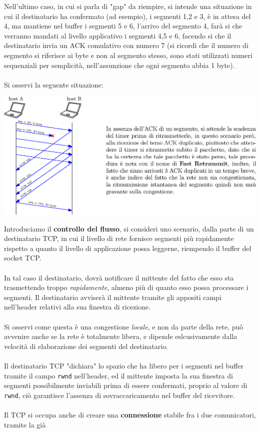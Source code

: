 \documentclass[12pt, letterpaper]{article}
\newcommand{\code}[1]{\colorbox{light-gray}{\texttt{#1}}}
\newcommand{\acc}{\\\hphantom{}\\}
\begin{document}
Nell'ultimo caso, in cui si parla di "gap" da riempire, si intende una situazione in cui il destinatario ha confermato 
(ad esempio), i segmenti 1,2 e 3, è in attesa del 4, ma mantiene nel buffer i segmenti 5 e 6, l'arrivo del 
segmento 4, farà si che verranno mandati al livello applicativo i segmenti 4,5 e 6, facendo si che il destinatario 
invia un ACK comulativo con numero 7 (si ricordi che il numero di segmento si riferisce ai byte e non al segmento 
stesso, sono stati utilizzati numeri sequenziali per semplicità, nell'assunzione che ogni segmento abbia 1 byte).\acc 
Si osservi la seguente situazione:\begin{center}
    \includegraphics[width=\textwidth ]{images/fastRetrasmit.eps}
\end{center} 
Introduciamo il \textbf{controllo del flusso}, si consideri uno scenario, dalla parte di un destinatario 
TCP, in cui il livello di rete fornisce segmenti più rapidamente rispetto a quanto il livello di applicazione 
possa leggerne, riempendo il buffer del socket TCP. \acc In tal caso il destinatario, dovrà notificare il mittente del 
fatto che esso sta trasmettendo troppo \textit{rapidamente}, almeno più di quanto esso possa processare i 
segmenti. Il destinatario avviserà il mittente tramite gli appositi campi nell'header relativi alla sua finestra 
di ricezione.\acc 
Si osservi come questa è una congestione \textit{locale}, e non da parte della rete, può avvenire anche se la rete 
è totalmente libera, e dipende eslcusivamente dalla velocità di elaborazione dei segmenti del destinatario.\acc 
Il destinatario TCP "dichiara" lo spazio che ha libero per i segmenti nel buffer tramite il 
campo \code{rwnd} nell'header, ed il mittente imposta la sua finestra di segmenti possibilmente 
inviabili prima di essere confermati, proprio al valore di \code{rwnd}, ciò garantisce l'assenza di 
sovraccaricamento nel buffer del ricevitore.\acc 
Il TCP si occupa anche di creare una \textbf{connessione} stabile fra i due comunicatori, tramite la già 
\end{document}
